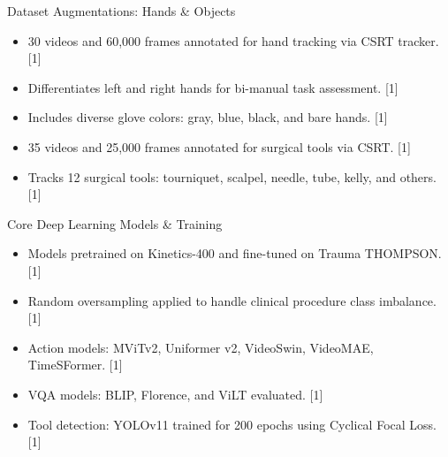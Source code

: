 \documentclass[aspectratio=169, 10pt]{beamer}
\begin{document}
\begin{frame}{Dataset Augmentations: Hands \& Objects}
    \vspace{0.3cm}
    \begin{itemize}
        \setlength{\itemsep}{8pt}
        \item 30 videos and 60,000 frames annotated for hand tracking via CSRT tracker. [1]
        \item Differentiates left and right hands for bi-manual task assessment. [1]
        \item Includes diverse glove colors: gray, blue, black, and bare hands. [1]
        \item 35 videos and 25,000 frames annotated for surgical tools via CSRT. [1]
        \item Tracks 12 surgical tools: tourniquet, scalpel, needle, tube, kelly, and others. [1]
    \end{itemize}
\end{frame}

\begin{frame}{Core Deep Learning Models \& Training}
    \vspace{0.3cm}
    \begin{itemize}
        \setlength{\itemsep}{8pt}
        \item Models pretrained on Kinetics-400 and fine-tuned on Trauma THOMPSON. [1]
        \item Random oversampling applied to handle clinical procedure class imbalance. [1]
        \item Action models: MViTv2, Uniformer v2, VideoSwin, VideoMAE, TimeSFormer. [1]
        \item VQA models: BLIP, Florence, and ViLT evaluated. [1]
        \item Tool detection: YOLOv11 trained for 200 epochs using Cyclical Focal Loss. [1]
    \end{itemize}
\end{frame}
\end{document}
